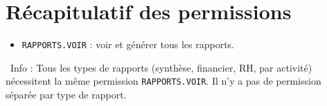 \documentclass[12pt,a4paper]{article}
\newcommand{\info}[1]{\par\noindent\textcolor{lagoon}{\faInfoCircle\ Info : #1}\par}
\begin{document}
\newpage

\section{Récapitulatif des permissions}

\begin{itemize}[label=\textcolor{lagoon}{\faKey}]
  \item \texttt{RAPPORTS.VOIR} : voir et générer tous les rapports.
\end{itemize}

\info{Tous les types de rapports (synthèse, financier, RH, par activité) nécessitent la même permission \texttt{RAPPORTS.VOIR}. Il n'y a pas de permission séparée par type de rapport.}

\vfill

\begin{center}
\end{center}
\end{document}
